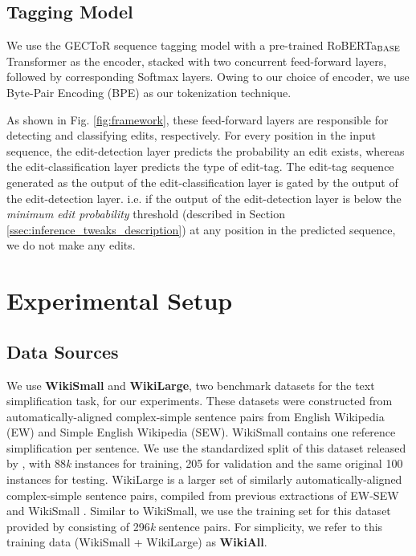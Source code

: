 \documentclass[11pt,a4paper]{article}
\begin{document}
\subsection{Tagging Model}
\label{ssec:tagging_model}
We use the GECToR sequence tagging model with a pre-trained RoBERTa$_{\textsc{BASE}}$ Transformer \cite{DBLP:journals/corr/abs-1907-11692} as the encoder, stacked with two concurrent feed-forward layers, followed by corresponding Softmax layers. Owing to our choice of encoder, we use Byte-Pair Encoding (BPE) \cite{sennrich-etal-2016-neural} as our tokenization technique. 

As shown in Fig. \ref{fig:framework}, these feed-forward layers are responsible for detecting and classifying edits, respectively. For every position in the input sequence, the edit-detection layer predicts the probability an edit exists, whereas the edit-classification layer predicts the type of edit-tag. 
The edit-tag sequence generated as the output of the edit-classification layer is gated by the output of the edit-detection layer. 
i.e. if the output of the edit-detection layer 
is below the \textit{minimum edit probability} threshold (described in Section \ref{ssec:inference_tweaks_description}) at any position in the predicted sequence, we do not make any edits. 





\section{Experimental Setup}
\label{sec:experimental_setup}

\subsection{Data Sources}
\label{section:data_sources}
We use \textbf{WikiSmall} and \textbf{WikiLarge}, two benchmark datasets for the text simplification task\footnotemark, for our experiments. These datasets were constructed from automatically-aligned complex-simple sentence pairs from English Wikipedia (EW) and Simple English Wikipedia (SEW). WikiSmall \cite{zhu-etal-2010-monolingual} contains one reference simplification per sentence. We use the standardized split of this dataset released by \citet{zhang-lapata-2017-sentence}, with 88\textit{k} instances for training, 205 for validation and the same original 100 instances for testing. WikiLarge is a larger set of similarly automatically-aligned complex-simple sentence pairs, compiled from previous extractions of EW-SEW and WikiSmall \cite{zhu-etal-2010-monolingual, woodsend-lapata-2011-learning, kauchak-2013-improving}. Similar to WikiSmall, we use the training set for this dataset provided by \citet{zhang-lapata-2017-sentence} consisting of 296\textit{k} sentence pairs. For simplicity, we refer to this training data (WikiSmall + WikiLarge) as \textbf{WikiAll}.
\end{document}
